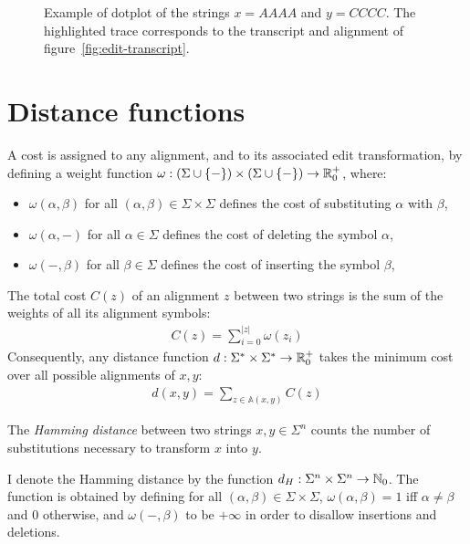 \begin{figure}[h]
\begin{center}
\caption[Example of dotplot]{Example of dotplot of the strings $x=AAAA$ and $y=CCCC$. The highlighted trace corresponds to the transcript and alignment of figure~\ref{fig:edit-transcript}.}
\label{fig:dotplot}

\end{center}
\end{figure}

\section{Distance functions}

A cost is assigned to any alignment, and to its associated edit transformation, by defining a weight function $\omega : (\Sigma \cup \{ - \}) \times (\Sigma \cup \{ - \}) \rightarrow \mathbb {R}_0^{+}$, where:
\begin{itemize}
\item $\omega(\alpha,\beta)$ for all $(\alpha,\beta) \in \Sigma \times \Sigma$ defines the cost of substituting $\alpha$ with $\beta$,
\item $\omega(\alpha,-)$ for all $\alpha \in \Sigma$ defines the cost of deleting the symbol $\alpha$,
\item $\omega(-,\beta)$ for all $\beta \in \Sigma$ defines the cost of inserting the symbol $\beta$,
\end{itemize}

The total cost $C(z)$ of an alignment $z$ between two strings is the sum of the weights of all its alignment symbols:
\begin{eqnarray}
C(z) = \sum_{i=0}^{|z|}{\omega(z_i)}
\end{eqnarray}
Consequently, any distance function $d : \Sigma^{*} \times \Sigma^{*} \rightarrow \mathbb {R}_0^{+}$ takes the minimum cost over all possible alignments of $x,y$:
\begin{eqnarray}
d(x,y) = \sum_{z \in \mathbb{A}(x,y)}{C(z)}
\end{eqnarray}

\begin{definition}
\label{def:hamming}
The \emph{Hamming distance} between two strings $x,y \in \Sigma^{n}$ counts the number of substitutions necessary to transform $x$ into $y$.
\end{definition}
I denote the Hamming distance by the function $d_H : \Sigma^{n} \times \Sigma^{n} \rightarrow \mathbb {N}_0$.
The function is obtained by defining for all $(\alpha,\beta) \in \Sigma \times \Sigma$, $\omega(\alpha,\beta) = 1$ iff $\alpha \neq \beta$ and 0 otherwise, and $\omega(-,\beta)$ to be $+ \infty$ in order to disallow insertions and deletions.

